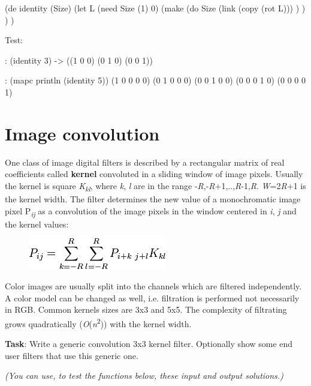 \begin{wideverbatim}

(de identity (Size)
   (let L (need Size (1) 0)
      (make
         (do Size
            (link (copy (rot L))) ) ) ) )

Test:

: (identity 3)
-> ((1 0 0) (0 1 0) (0 0 1))

: (mapc println (identity 5))
(1 0 0 0 0)
(0 1 0 0 0)
(0 0 1 0 0)
(0 0 0 1 0)
(0 0 0 0 1)

\end{wideverbatim}

\pagebreak{}
\section*{Image convolution}

One class of image digital filters is described by a rectangular matrix
of real coefficients called \textbf{kernel} convoluted in a sliding
window of image pixels. Usually the kernel is square
\emph{K}\textsubscript{\emph{k}\emph{l}}, where \emph{k}, \emph{l} are
in the range -\emph{R},-\emph{R}+1,..,\emph{R}-1,\emph{R}.
\emph{W}=2\emph{R}+1 is the kernel width. The filter determines the new
value of a monochromatic image pixel P\textsubscript{\emph{ij}} as a
convolution of the image pixels in the window centered in \emph{i},
\emph{j} and the kernel values:

\begin{figure}[H]
\centering
\includegraphics[scale=.6]{graphics/058aad0ea1d9f900745a1e688b75cec8.png}
\end{figure}

Color images are usually split into the channels which are filtered
independently. A color model can be changed as well, i.e. filtration
is performed not necessarily in RGB. Common kernels sizes are 3x3 and
5x5. The complexity of filtrating grows quadratically
(\emph{O}(\emph{n}\textsuperscript{2})) with the kernel width.

\textbf{Task}: Write a generic convolution 3x3 kernel filter. Optionally
show some end user filters that use this generic one.

\emph{(You can use, to test the functions below, these \emph{input}
  and \emph{output} solutions.)}



